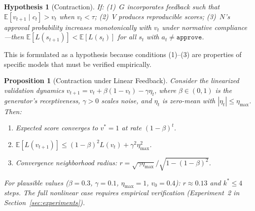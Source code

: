 \documentclass[11pt,a4paper]{article}
\newtheorem{proposition}{Proposition}[section]
\newtheorem{hypothesis}{Hypothesis}[section]
\theoremstyle{definition}
\begin{document}
\begin{hypothesis}[Contraction]
\label{hyp:contraction}
If: (1)~$G$ incorporates feedback such that $\mathbb{E}[v_{t+1} \mid c_t] > v_t$ when $v_t < \tau$; (2)~$V$ produces reproducible scores; (3)~$N$'s approval probability increases monotonically with $v_t$ under normative compliance---then $\mathbb{E}[L(s_{t+1})] < \mathbb{E}[L(s_t)]$ for all $s_t$ with $a_t \neq \texttt{approve}$.
\end{hypothesis}

This is formulated as a hypothesis because conditions (1)--(3) are properties of specific models that must be verified empirically.

\begin{proposition}[Contraction under Linear Feedback]
\label{prop:linearcontraction}
Consider the linearized validation dynamics $v_{t+1} = v_t + \beta(1 - v_t) - \gamma\eta_t$, where $\beta \in (0,1)$ is the generator's receptiveness, $\gamma > 0$ scales noise, and $\eta_t$ is zero-mean with $|\eta_t| \leq \eta_\text{max}$. Then:
\begin{enumerate}[leftmargin=*,itemsep=2pt]
\item Expected score converges to $v^* = 1$ at rate $(1-\beta)^t$.
\item $\mathbb{E}[L(v_{t+1})] \leq (1-\beta)^2 L(v_t) + \gamma^2 \eta_\text{max}^2$.
\item Convergence neighborhood radius: $r = \sqrt{\gamma\eta_\text{max}} / \sqrt{1 - (1-\beta)^2}$.
\end{enumerate}
For plausible values ($\beta=0.3$, $\gamma=0.1$, $\eta_\text{max}=1$, $v_0=0.4$): $r \approx 0.13$ and $k^* \leq 4$ steps. The full nonlinear case requires empirical verification (Experiment~2 in Section~\ref{sec:experiments}).
\end{proposition}



\end{document}
